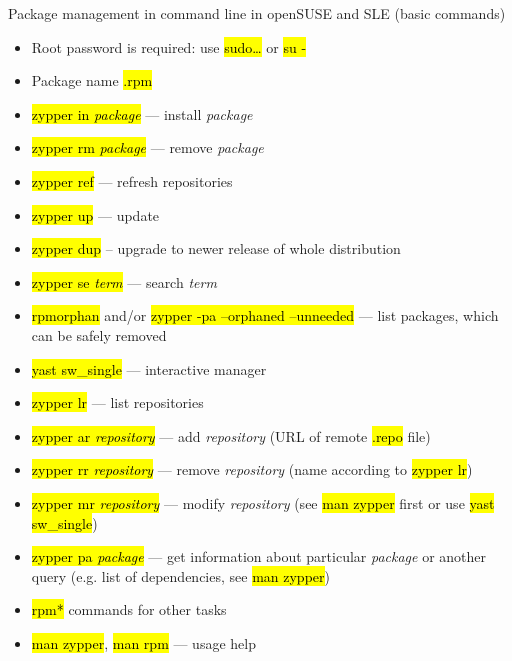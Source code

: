 \documentclass[compress, ucs, xelatex, 11pt, xcolor=svgnames,
  hyperref={
    bookmarks=true,
    unicode=true,
    colorlinks=true,
    pdftitle={Linux, command line and MetaCentrum},
    plainpages=false,
    pdfauthor={Vojtech Zeisek},
    pdfsubject={Course about use of Linux command line, writing shell scripts and using MetaCentrum of CESNET},
    pdfcreator={XeLaTeX},
    pdfkeywords={Linux, GNU, BASH, shell, command line, MetaCentrum},
    linkcolor=DarkRed,
    anchorcolor=DarkBlue,
    citecolor=Indigo,
    filecolor=NavyBlue,
    menucolor=DarkMagenta,
    urlcolor=DarkBlue,
    pdftex},
  url={hyphens, lowtilde} %
  ]{beamer}
\renewcommand{\texttt}[1]{\hl{\ttfamily #1}}
\begin{document}
\begin{frame}[allowframebreaks]{Package management in command line in openSUSE and SLE (basic commands)}
  \begin{itemize}
    \item Root password is required: use \texttt{sudo\ldots} or \texttt{su -}
    \item Package name \texttt{*.rpm}
    \item \texttt{zypper in \textit{package}} --- install \textit{package}
    \item \texttt{zypper rm \textit{package}} --- remove \textit{package}
    \item \texttt{zypper ref} --- refresh repositories
    \item \texttt{zypper up} --- update
    \item \texttt{zypper dup} -- upgrade to newer release of whole distribution
    \item \texttt{zypper se \textit{term}} --- search \textit{term}
    \item \texttt{rpmorphan} and/or \texttt{zypper -pa --orphaned --unneeded} --- list packages, which can be safely removed
    \item \texttt{yast sw\_single} --- interactive manager
    \item \texttt{zypper lr} --- list repositories
    \item \texttt{zypper ar \textit{repository}} --- add \textit{repository} (URL of remote \texttt{*.repo} file)
    \item \texttt{zypper rr \textit{repository}} --- remove \textit{repository} (name according to \texttt{zypper lr})
    \item \texttt{zypper mr \textit{repository}} --- modify \textit{repository} (see \texttt{man zypper} first or use \texttt{yast sw\_single})
    \item \texttt{zypper pa \textit{package}} --- get information about particular \textit{package} or another query (e.g. list of dependencies, see \texttt{man zypper})
    \item \texttt{rpm*} commands for other tasks
    \item \texttt{man zypper}, \texttt{man rpm} --- usage help
  \end{itemize}
\end{frame}
\end{document}
